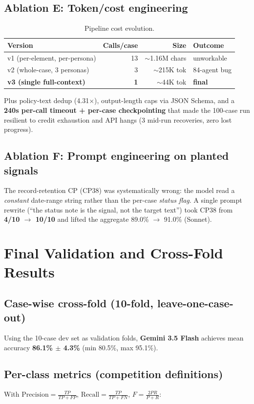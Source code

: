 \documentclass[11pt,a4paper]{article}
\begin{document}
\subsection{Ablation E: Token/cost engineering}
\begin{table}[htbp]\centering\small
\caption{Pipeline cost evolution.}
\begin{tabular}{@{}lrrl@{}}
\toprule
\textbf{Version} & \textbf{Calls/case} & \textbf{Size} & \textbf{Outcome} \\
\midrule
v1 (per-element, per-persona) & 13 & $\sim$1.16M chars & unworkable \\
v2 (whole-case, 3 personas) & 3 & $\sim$215K tok & 84-agent bug \\
\textbf{v3 (single full-context)} & \textbf{1} & $\sim$44K tok & \textbf{final} \\
\bottomrule
\end{tabular}
\end{table}

Plus policy-text dedup (4.31$\times$), output-length caps via JSON Schema, and a \textbf{240s per-call timeout + per-case checkpointing} that made the 100-case run resilient to credit exhaustion and API hangs (3 mid-run recoveries, zero lost progress).

\subsection{Ablation F: Prompt engineering on planted signals}
The record-retention CP (CP38) was systematically wrong: the model read a \emph{constant} date-range string rather than the per-case \emph{status flag}. A single prompt rewrite (``the status note is the signal, not the target text'') took CP38 from \textbf{4/10 $\to$ 10/10} and lifted the aggregate 89.0\% $\to$ 91.0\% (Sonnet).

\section{Final Validation and Cross-Fold Results}

\subsection{Case-wise cross-fold (10-fold, leave-one-case-out)}
Using the 10-case dev set as validation folds, \textbf{Gemini 3.5 Flash} achieves mean accuracy \textbf{86.1\% $\pm$ 4.3\%} (min 80.5\%, max 95.1\%).

\subsection{Per-class metrics (competition definitions)}
With $\text{Precision}=\frac{TP}{TP+FP}$, $\text{Recall}=\frac{TP}{TP+FN}$, $F=\frac{2PR}{P+R}$:
\end{document}
